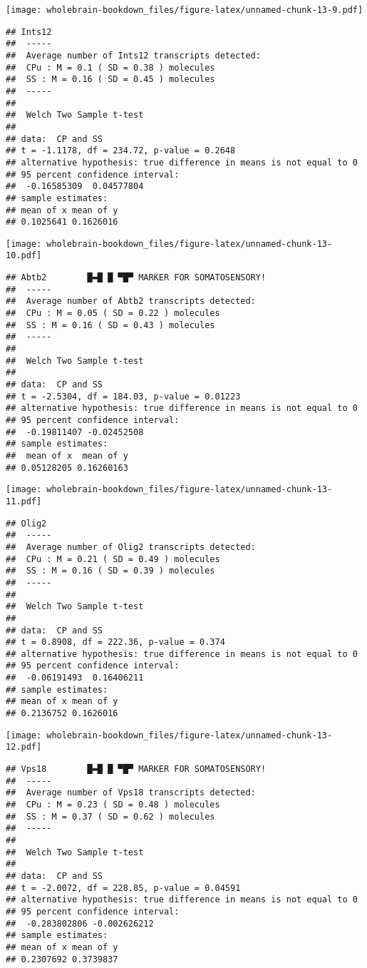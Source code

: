 \documentclass[]{book}
\theoremstyle{definition}
\theoremstyle{definition}
\theoremstyle{remark}
\begin{document}
\texttt{[image: wholebrain-bookdown\_files/figure-latex/unnamed-chunk-13-9.pdf]}

\begin{verbatim}
## Ints12
##  -----
##  Average number of Ints12 transcripts detected:
##  CPu : M = 0.1 ( SD = 0.38 ) molecules 
##  SS : M = 0.16 ( SD = 0.45 ) molecules
##  -----
## 
##  Welch Two Sample t-test
## 
## data:  CP and SS
## t = -1.1178, df = 234.72, p-value = 0.2648
## alternative hypothesis: true difference in means is not equal to 0
## 95 percent confidence interval:
##  -0.16585309  0.04577804
## sample estimates:
## mean of x mean of y 
## 0.1025641 0.1626016
\end{verbatim}

\texttt{[image: wholebrain-bookdown\_files/figure-latex/unnamed-chunk-13-10.pdf]}

\begin{verbatim}
## Abtb2        █▬█ █ ▀█▀ MARKER FOR SOMATOSENSORY!
##  -----
##  Average number of Abtb2 transcripts detected:
##  CPu : M = 0.05 ( SD = 0.22 ) molecules 
##  SS : M = 0.16 ( SD = 0.43 ) molecules
##  -----
## 
##  Welch Two Sample t-test
## 
## data:  CP and SS
## t = -2.5304, df = 184.03, p-value = 0.01223
## alternative hypothesis: true difference in means is not equal to 0
## 95 percent confidence interval:
##  -0.19811407 -0.02452508
## sample estimates:
##  mean of x  mean of y 
## 0.05128205 0.16260163
\end{verbatim}

\texttt{[image: wholebrain-bookdown\_files/figure-latex/unnamed-chunk-13-11.pdf]}

\begin{verbatim}
## Olig2
##  -----
##  Average number of Olig2 transcripts detected:
##  CPu : M = 0.21 ( SD = 0.49 ) molecules 
##  SS : M = 0.16 ( SD = 0.39 ) molecules
##  -----
## 
##  Welch Two Sample t-test
## 
## data:  CP and SS
## t = 0.8908, df = 222.36, p-value = 0.374
## alternative hypothesis: true difference in means is not equal to 0
## 95 percent confidence interval:
##  -0.06191493  0.16406211
## sample estimates:
## mean of x mean of y 
## 0.2136752 0.1626016
\end{verbatim}

\texttt{[image: wholebrain-bookdown\_files/figure-latex/unnamed-chunk-13-12.pdf]}

\begin{verbatim}
## Vps18        █▬█ █ ▀█▀ MARKER FOR SOMATOSENSORY!
##  -----
##  Average number of Vps18 transcripts detected:
##  CPu : M = 0.23 ( SD = 0.48 ) molecules 
##  SS : M = 0.37 ( SD = 0.62 ) molecules
##  -----
## 
##  Welch Two Sample t-test
## 
## data:  CP and SS
## t = -2.0072, df = 228.85, p-value = 0.04591
## alternative hypothesis: true difference in means is not equal to 0
## 95 percent confidence interval:
##  -0.283802806 -0.002626212
## sample estimates:
## mean of x mean of y 
## 0.2307692 0.3739837
\end{verbatim}
\end{document}
